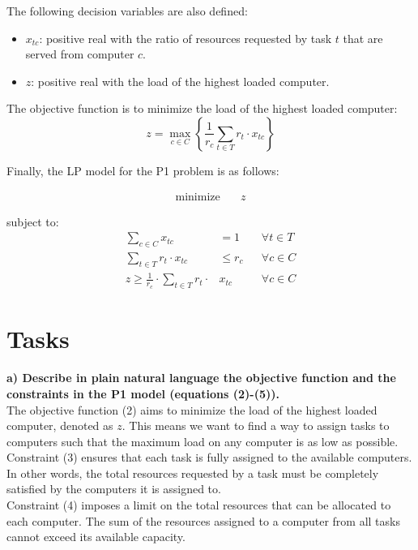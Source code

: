\documentclass{article}
\begin{document}
The following decision variables are also defined:
\begin{itemize}
    \item $x_{tc}$: positive real with the ratio of resources requested by task $t$ that are served from computer $c$.
    \item $z$: positive real with the load of the highest loaded computer.
\end{itemize}

The objective function is to minimize the load of the highest loaded computer:
\begin{equation}
z = \max_{c \in C} \left\{ \frac{1}{r_c} \sum_{t \in T} r_t \cdot x_{tc} \right\} \tag{1}
\end{equation}

Finally, the LP model for the P1 problem is as follows:

\begin{align}
\text{minimize} \quad & z \tag{2}
\end{align}

subject to:
\begin{align}
\sum_{c \in C} x_{tc} &= 1 && \forall t \in T \tag{3} \\
\sum_{t \in T} r_t \cdot x_{tc} &\leq r_c && \forall c \in C \tag{4} \\
z \geq \frac{1}{r_c} \cdot \sum_{t \in T} r_t \cdot & x_{tc} && \forall c \in C \tag{5}
\end{align}
\newpage
\section{Tasks}

\textbf{a) Describe in plain natural language the objective function and the constraints in the P1 model (equations (2)-(5)).}\\

The objective function (2) aims to minimize the load of the highest loaded computer, denoted as \( z \). This means we want to find a way to assign tasks to computers such that the maximum load on any computer is as low as possible.\\

Constraint (3) ensures that each task is fully assigned to the available computers. In other words, the total resources requested by a task must be completely satisfied by the computers it is assigned to.\\

Constraint (4) imposes a limit on the total resources that can be allocated to each computer. The sum of the resources assigned to a computer from all tasks cannot exceed its available capacity.\\
\end{document}
